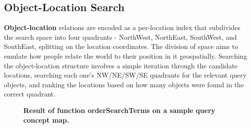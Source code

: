 



\subsection{Object-Location Search}
\textbf{Object-location} relations are encoded as a per-location index that subdivides the search space into four quadrants - NorthWest, NorthEast, SouthWest, and SouthEast, splitting on the location coordinates. The division of space aims to emulate how people relate the world to their position in it geospatially. 
Searching the object-location structure involves a simple iteration through the candidate locations, searching each one's NW/NE/SW/SE quadrants for the relevant query objects, and ranking the locations based on how many objects were found in the correct quadrant.





\begin{figure}[h]
    \centering
        
    \caption{\textbf{Result of function orderSearchTerms on a sample query concept map.}}\label{figure:compass_traversal-LO} 
\end{figure}

